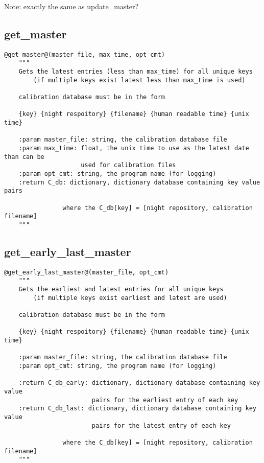 \noindent Note: exactly the same as update\_master? \\

\subsection{get\_master}
\begin{lstlisting}[style=pythonstyle]
@get_master@(master_file, max_time, opt_cmt)
    """
    Gets the latest entries (less than max_time) for all unique keys 
        (if multiple keys exist latest less than max_time is used)
        
    calibration database must be in the form
    
    {key} {night respoitory} {filename} {human readable time} {unix time}
    
    :param master_file: string, the calibration database file
    :param max_time: float, the unix time to use as the latest date than can be
                     used for calibration files
    :param opt_cmt: string, the program name (for logging)
    :return C_db: dictionary, dictionary database containing key value pairs
        
                where the C_db[key] = [night repository, calibration filename]
    """
\end{lstlisting}

\subsection{get\_early\_last\_master}
\begin{lstlisting}[style=pythonstyle]
@get_early_last_master@(master_file, opt_cmt)
    """
    Gets the earliest and latest entries for all unique keys
        (if multiple keys exist earliest and latest are used)

    calibration database must be in the form

    {key} {night respoitory} {filename} {human readable time} {unix time}

    :param master_file: string, the calibration database file
    :param opt_cmt: string, the program name (for logging)
    
    :return C_db_early: dictionary, dictionary database containing key value
                        pairs for the earliest entry of each key
    :return C_db_last: dictionary, dictionary database containing key value
                        pairs for the latest entry of each key

                where the C_db[key] = [night repository, calibration filename]
    """
\end{lstlisting}

